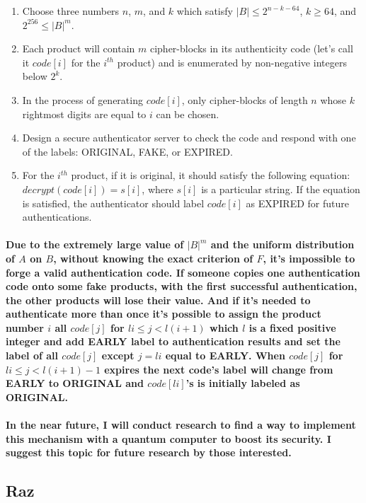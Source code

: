 \documentclass[oneside]{book}
\newcommand{\myparagraph}[1]{\paragraph{\textnormal{#1}}}
\begin{document}
\begin{enumerate}
    \item{Choose three numbers $n$, $m$, and $k$ which satisfy $|B| \le 2^{n - k - 64}$, $k \ge 64$, and $2^{256} \le |B|^m$.}
    \item{Each product will contain $m$ cipher-blocks in its authenticity code (let's call it $code[i]$ for the $i^{th}$ product) and is enumerated by non-negative integers below $2^k$.}
    \item{In the process of generating $code[i]$, only cipher-blocks of length $n$ whose $k$ rightmost digits are equal to $i$ can be chosen.}
    \item{Design a secure authenticator server to check the code and respond with one of the labels: ORIGINAL, FAKE, or EXPIRED.}
    \item{For the $i^{th}$ product, if it is original, it should satisfy the following equation: \newline $decrypt(code[i]) = s[i]$, where $s[i]$ is a particular string. If the equation is satisfied, the authenticator should label $code[i]$ as EXPIRED for future authentications.}
\end{enumerate}

\myparagraph{
Due to the extremely large value of $|B|^m$ and the uniform distribution of $A$ on $B$, without knowing the exact criterion of $F$, it's impossible to forge a valid authentication code. If someone copies one authentication code onto some fake products, with the first successful authentication, the other products will lose their value. And if it's needed to authenticate more than once it's possible to assign the product number $i$ all $code[j]$ for $li \le j < l(i+1)$ which $l$ is a fixed positive integer and add EARLY label to authentication results and set the label of all $code[j]$ except $j = li$ equal to EARLY. When $code[j]$ for $li \le j < l(i+1)-1$ expires the next code's label will change from EARLY to ORIGINAL and $code[li]$'s is initially labeled as ORIGINAL.
}

\myparagraph{
In the near future, I will conduct research to find a way to implement this mechanism with a quantum computer to boost its security. I suggest this topic for future research by those interested.
}

\newpage

\subsection{Raz}
\end{document}
